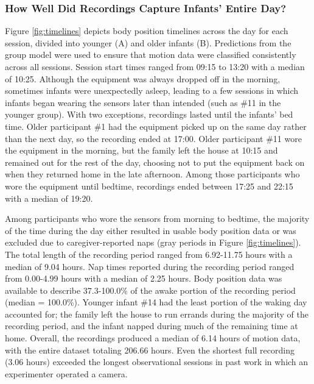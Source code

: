 \documentclass[
  man]{apa6}
\begin{document}
\hypertarget{how-well-did-recordings-capture-infants-entire-day}{%
\subsubsection{How Well Did Recordings Capture Infants' Entire Day?}\label{how-well-did-recordings-capture-infants-entire-day}}

Figure \ref{fig:timelines} depicts body position timelines across the day for each session, divided into younger (A) and older infants (B). Predictions from the group model were used to ensure that motion data were classified consistently across all sessions. Session start times ranged from 09:15 to 13:20 with a median of 10:25. Although the equipment was always dropped off in the morning, sometimes infants were unexpectedly asleep, leading to a few sessions in which infants began wearing the sensors later than intended (such as \#11 in the younger group). With two exceptions, recordings lasted until the infants' bed time. Older participant \#1 had the equipment picked up on the same day rather than the next day, so the recording ended at 17:00. Older participant \#11 wore the equipment in the morning, but the family left the house at 10:15 and remained out for the rest of the day, choosing not to put the equipment back on when they returned home in the late afternoon. Among those participants who wore the equipment until bedtime, recordings ended between 17:25 and 22:15 with a median of 19:20.

Among participants who wore the sensors from morning to bedtime, the majority of the time during the day either resulted in usable body position data or was excluded due to caregiver-reported naps (gray periods in Figure \ref{fig:timelines}). The total length of the recording period ranged from 6.92-11.75 hours with a median of 9.04 hours. Nap times reported during the recording period ranged from 0.00-4.99 hours with a median of 2.25 hours. Body position data was available to describe 37.3-100.0\% of the awake portion of the recording period (median = 100.0\%). Younger infant \#14 had the least portion of the waking day accounted for; the family left the house to run errands during the majority of the recording period, and the infant napped during much of the remaining time at home. Overall, the recordings produced a median of 6.14 hours of motion data, with the entire dataset totaling 206.66 hours. Even the shortest full recording (3.06 hours) exceeded the longest observational sessions in past work in which an experimenter operated a camera.
\end{document}
